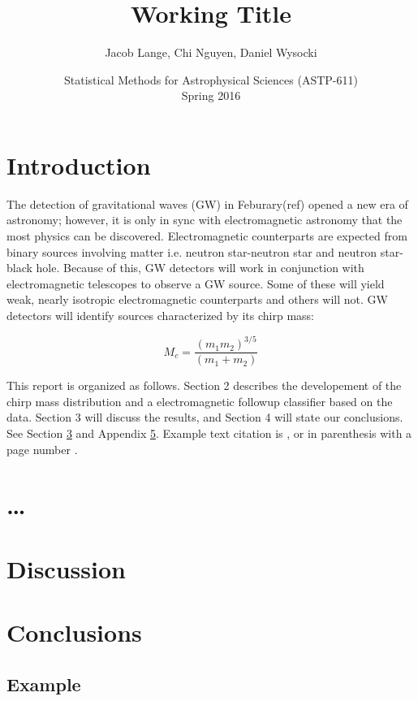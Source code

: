 \documentclass[12pt]{article}
\title{
  Working Title
}
\author{
  Jacob Lange, Chi Nguyen, Daniel Wysocki
}
\date{
  Statistical Methods for Astrophysical Sciences (ASTP-611)
  \\
  Spring 2016
}
\begin{document}
\maketitle


\begin{abstract}


\end{abstract}


\section{Introduction}
\label{sec:intro}
The detection of gravitational waves (GW) in Feburary(ref) opened a new era of astronomy; however, it is only in sync with electromagnetic astronomy that the most physics can be discovered. Electromagnetic counterparts are expected from binary sources involving matter i.e. neutron star-neutron star and neutron star-black hole. Because of this, GW detectors will work in conjunction with electromagnetic telescopes to observe a GW source. Some of these will yield weak, nearly isotropic electromagnetic counterparts and others will not. GW detectors will identify sources characterized by its chirp mass:

\begin{equation}
M_{c}=\frac{(m_{1}m_{2})^{3/5}}{(m_{1}+m_{2})}
\end{equation}

This report is organized as follows. Section 2 describes the developement of the chirp mass distribution and a electromagnetic followup classifier based on the data. Section 3 will discuss the results, and Section 4 will state our conclusions.
See Section \ref{sec:discussion} and Appendix \ref{app:example}. Example text citation is \textcite{2012ApJ...759...52D}, or in parenthesis with a page number \parencite[pg 2]{2012ApJ...759...52D}.


\section{\ldots}
\label{sec:more}





\section{Discussion}
\label{sec:discussion}




\section{Conclusions}
\label{sec:conclusions}




\printbibliography[heading=subbibliography]

\begin{appendices}

\section{Example}
\label{app:example}


\end{appendices}
\end{document}

